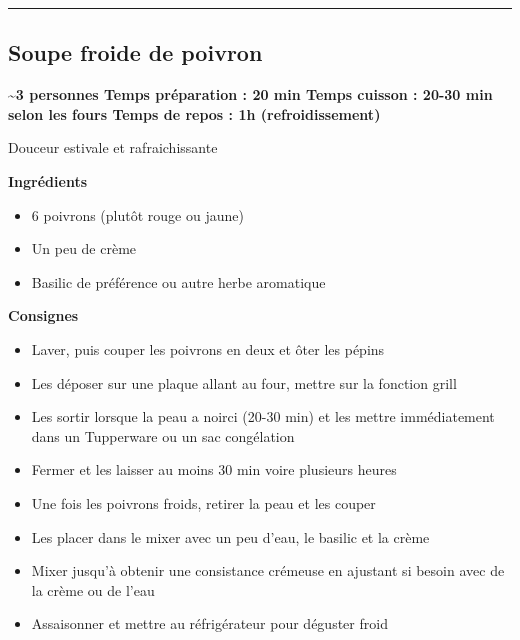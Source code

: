 \documentclass[]{book}
\providecommand{\tightlist}{%
  \setlength{\itemsep}{0pt}\setlength{\parskip}{0pt}}
\begin{document}
\begin{center}\rule{0.5\linewidth}{0.5pt}\end{center}

\subsection*{\texorpdfstring{{Soupe froide de
poivron}}{Soupe froide de poivron}}\label{soupe-froide-de-poivron}

\begin{salebox}
\textbf{\textasciitilde{}3 personnes \textbar{} Temps préparation : 20
min \textbar{} Temps cuisson : 20-30 min selon les fours\textbar{} Temps
de repos : 1h (refroidissement)}

Douceur estivale et rafraichissante
\end{salebox}

 \textbf{Ingrédients}

\begin{itemize}
\tightlist
\item
  6 poivrons (plutôt rouge ou jaune)
\item
  Un peu de crème
\item
  Basilic de préférence ou autre herbe aromatique
\end{itemize}

\textbf{Consignes}

\begin{itemize}
\tightlist
\item
  Laver, puis couper les poivrons en deux et ôter les pépins
\item
  Les déposer sur une plaque allant au four, mettre sur la fonction
  grill
\item
  Les sortir lorsque la peau a noirci (20-30 min) et les mettre
  immédiatement dans un Tupperware ou un sac congélation
\item
  Fermer et les laisser au moins 30 min voire plusieurs heures
\item
  Une fois les poivrons froids, retirer la peau et les couper
\item
  Les placer dans le mixer avec un peu d'eau, le basilic et la crème
\item
  Mixer jusqu'à obtenir une consistance crémeuse en ajustant si besoin
  avec de la crème ou de l'eau
\item
  Assaisonner et mettre au réfrigérateur pour déguster froid
\end{itemize}
\end{document}
